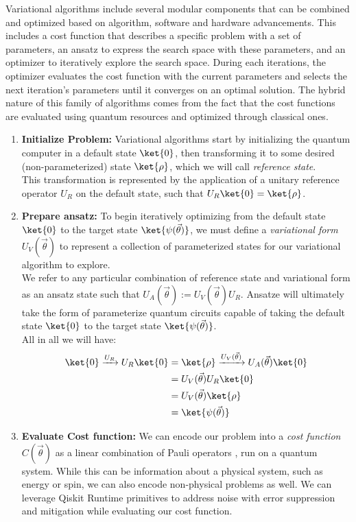 \documentclass[12pt, oneside]{book}
\theoremstyle{definition}
\theoremstyle{definition}
\theoremstyle{remark}
\begin{document}
Variational algorithms include several modular components that can be combined and optimized based on algorithm, software and hardware advancements. This includes a cost function that describes a specific problem with a set of parameters, an ansatz to express the search space with these parameters, and an optimizer to iteratively explore the search space. During each iterations, the optimizer evaluates the cost function with the current parameters and selects the next iteration's parameters until it converges on an optimal solution. The hybrid nature of this family of algorithms comes from the fact that the cost functions are evaluated using quantum resources and optimized through classical ones.

\begin{enumerate}
    \item \textbf{Initialize Problem: }Variational algorithms start by initializing the quantum computer in a default state $\ket{0}$, then transforming it to some desired (non-parameterized) state $\ket{\rho}$, which we will call \textit{reference state}.\\
    This transformation is represented by the application of a unitary reference operator $U_R$ on the default state, such that $U_R\ket{0}=\ket{\rho}$.
    \item \textbf{Prepare ansatz: }To begin iteratively optimizing from the default state $\ket{0}$ to the target state $\ket{\psi(\vec{\theta})}$, we must define a \textit{variational form} $U_V(\vec{\theta})$ to represent a collection of parameterized states for our variational algorithm to explore.\\
    We refer to any particular combination of reference state and variational form as an ansatz state such that $U_A(\vec{\theta}):=U_V(\vec{\theta})U_R$. Ansatze will ultimately take the form of parameterize quantum circuits capable of taking the default state $\ket{0}$ to the target state $\ket{\psi(\vec{\theta})}$.\\
    All in all we will have:
    \begin{align*}
        \ket{0}\xrightarrow{U_R} U_R\ket{0}&=\ket{\rho}\xrightarrow{U_V(\vec{\theta})} U_A(\vec{\theta})\ket{0}\\
        &=U_V(\vec{\theta})U_R\ket{0}\\
        &=U_V(\vec{\theta})\ket{\rho}\\
        &=\ket{\psi(\vec{\theta})}
    \end{align*}
    \item \textbf{Evaluate Cost function: }We can encode our problem into a \textit{cost function} $C(\vec{\theta})$ as a linear combination of Pauli operators , run on a quantum system. While this can be information about a physical system, such as energy or spin, we can also encode non-physical problems as well. We can leverage Qiskit Runtime primitives to address noise with error suppression and mitigation while evaluating our cost function.

\end{enumerate}
\end{document}
